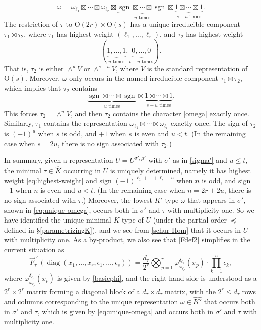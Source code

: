 \documentclass[11pt,oneside]{amsart}
\numberwithin{equation}{section}
\theoremstyle{remark}
\theoremstyle{plain}
\DeclareMathOperator{\diag}{diag}
\DeclareMathOperator{\sgn}{sgn}
\newcommand\OO{\mathrm{O}}
\renewcommand\leq{\leqslant}
\begin{document}
\begin{equation}\label{eq:unique-omega}
\omega=\omega_{\ell_1}\boxtimes\dotsb\boxtimes\omega_{\ell_r}
\boxtimes\underbrace{\sgn\boxtimes\dotsb\boxtimes\sgn}_{\text{$u$ times}}
\boxtimes\underbrace{1\boxtimes\dotsb\boxtimes1}_{\text{$s-u$ times}}.
\end{equation}
The restriction of $\tau$ to $\OO(2r)\times\OO(s)$ has a unique irreducible component $\tau_1\boxtimes\tau_2$, where $\tau_1$ has highest weight $(\ell_1,\dotsc,\ell_r)$, and $\tau_2$ has highest weight
\[(\underbrace{1,\dotsc,1}_{\text{$u$ times}},\underbrace{0,\dotsc,0}_{\text{$t-u$ times}}).\]
That is, $\tau_2$ is either $\wedge^u V$ or $\wedge^{s-u}V$, where $V$ is the standard representation of $\OO(s)$. Moreover, $\omega$ only occurs in the named irreducible component $\tau_1\boxtimes\tau_2$, which implies that $\tau_2$ contains
\begin{equation}\label{omega}
\underbrace{\sgn\boxtimes\dotsb\boxtimes\sgn}_{\text{$u$ times}}
\boxtimes\underbrace{1\boxtimes\dotsb\boxtimes1}_{\text{$s-u$ times}}.
\end{equation}
This forces $\tau_2=\wedge^u V$, and then $\tau_2$ contains the character \eqref{omega} exactly once. Similarly, $\tau_1$ contains the representation $\omega_{\ell_1}\boxtimes\dotsb\boxtimes\omega_{\ell_r}$ exactly once. The sign of $\tau_2$ is $(-1)^u$ when $s$ is odd, and $+1$ when $s$ is even and $u<t$. (In the remaining case when $s=2u$, there is no sign associated with $\tau_2$.)

In summary, given a representation $U=U^{\sigma',\mu'}$ with $\sigma'$ as in \eqref{sigma'} and $u\leq t$, the minimal $\tau\in\widehat{K}$ occurring in $U$ is uniquely determined, namely it has highest weight \eqref{eq:highest-weight} and sign $(-1)^{\ell_1+\dotsb+\ell_r+u}$ when $n$ is odd, and sign $+1$ when $n$ is even and $u<t$. (In the remaining case when $n=2r+2u$, there is no sign associated with $\tau$.) Moreover, the lowest $K'$-type $\omega$ that appears in $\sigma'$, shown in \eqref{eq:unique-omega}, occurs both in $\sigma'$ and $\tau$ with multiplicity one. So we have identified the unique minimal $K$-type of $U$ (under the partial order $\preceq$ defined in \S\ref{parametrizingK}), and we see from \eqref{schur-Hom} that it occurs in $U$ with multiplicity one. As a by-product, we also see that \eqref{Fdef2} simplifies in the current situation as
\begin{equation}\label{hatFtausigma2}
\hat F_\tau^{\sigma'}\left(\diag(x_1,\dotsc,x_r,\epsilon_1,\dotsc,\epsilon_s)\right)=\frac{d_\tau}{2^r}\bigotimes_{p=1}^r \varphi_{\omega_{\ell_p}}^{\delta_{\ell_p}} (x_p) \cdot \prod_{k=1}^u \epsilon_k,
\end{equation}
where $\varphi_{\omega_{\ell_p}}^{\delta_{\ell_p}}(x_p)$ is given by \eqref{basicphi}, and the right-hand side is understood as a $2^r\times 2^r$ matrix forming a diagonal block of a $d_\tau \times d_\tau$ matrix, with the $2^r\leq d_{\tau}$ rows and columns corresponding to the unique representation $\omega\in\widehat{K'}$ that occurs both in $\sigma'$ and $\tau$, which is given by \eqref{eq:unique-omega} and occurs both in $\sigma'$ and $\tau$ with multiplicity one.
\end{document}
